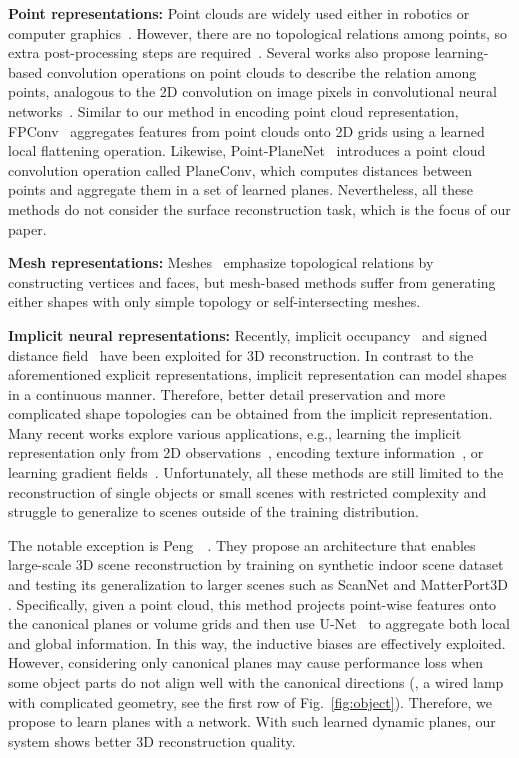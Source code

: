 \documentclass[10pt,twocolumn,letterpaper]{article}
\begin{document}
\textbf{Point representations:}
Point clouds are widely used either in robotics or computer graphics~\cite{fan2017point,pointnet,pointnet++}. 
However, there are no topological relations among points, so extra post-processing steps are required~\cite{curless1996volumetric,dai2020sg}. Several works also propose learning-based convolution operations on point clouds to describe the relation among points, analogous to the 2D convolution on image pixels in convolutional neural networks~\cite{lin2020fpconv, point-planenet, thomas2019kpconv, wu2019pointconv}. Similar to our method in encoding point cloud representation, FPConv~\cite{lin2020fpconv} aggregates features from point clouds onto 2D grids using a learned local flattening operation. Likewise, Point-PlaneNet~\cite{point-planenet} introduces a point cloud convolution operation called PlaneConv, which computes distances between points and aggregate them in a set of learned planes.
Nevertheless, all these methods do not consider the surface reconstruction task, which is the focus of our paper.

\textbf{Mesh representations:}
Meshes~\cite{gkioxari2019mesh,papier,human} emphasize topological relations by constructing vertices and faces, but mesh-based methods suffer from generating either shapes with only simple topology or self-intersecting meshes.

\textbf{Implicit neural representations:}
Recently, implicit occupancy~\cite{mescheder2018occupancy} and signed distance field~\cite{park2019deepsdf} have been exploited for 3D reconstruction. In contrast to the aforementioned explicit representations, implicit representation can model shapes in a continuous manner. Therefore, better detail preservation and more complicated shape topologies can be obtained from the implicit representation. Many recent works explore various applications, e.g., learning the implicit representation only from 2D observations~\cite{liu2019learning, liu2020dist,niemeyer2020differentiable}, encoding texture information~\cite{mildenhall2020nerf, oechsle2019texture}, or learning gradient fields~\cite{cai2020learning}. Unfortunately, all these methods are still limited to the reconstruction of single objects or small scenes with restricted complexity and struggle to generalize to scenes outside of the training distribution.

The notable exception is Peng~\etal~\cite{peng2020convolutional}. They propose an architecture that enables large-scale 3D scene reconstruction by training on synthetic indoor scene dataset and testing its generalization to larger scenes such as ScanNet \cite{dai2017scannet} and MatterPort3D \cite{chang2017matterport3d}.
Specifically, given a point cloud, this method projects point-wise features onto the canonical planes or volume grids and then use U-Net~\cite{unet} to aggregate both local and global information. In this way, the inductive biases are effectively exploited. However, considering only canonical planes may cause performance loss when some object parts do not align well with the canonical directions (\eg, a wired lamp with complicated geometry, see the first row of Fig.~\ref{fig:object}). Therefore, we propose to learn planes with a network. With such learned dynamic planes, our system shows better 3D reconstruction quality.
\end{document}
